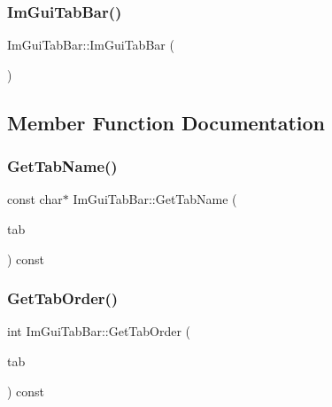 \subsubsection{\texorpdfstring{Im\+Gui\+Tab\+Bar()}{ImGuiTabBar()}}
{\footnotesize\ttfamily Im\+Gui\+Tab\+Bar\+::\+Im\+Gui\+Tab\+Bar (\begin{DoxyParamCaption}{ }\end{DoxyParamCaption})}



\subsection{Member Function Documentation}
\mbox{\label{structImGuiTabBar_a9296111fbd2316f354ca4bf952a09b93}} 
\subsubsection{\texorpdfstring{Get\+Tab\+Name()}{GetTabName()}}
{\footnotesize\ttfamily const char$\ast$ Im\+Gui\+Tab\+Bar\+::\+Get\+Tab\+Name (\begin{DoxyParamCaption}\item[{const \hyperlink{structImGuiTabItem}{Im\+Gui\+Tab\+Item} $\ast$}]{tab }\end{DoxyParamCaption}) const\hspace{0.3cm}{\ttfamily [inline]}}

\mbox{\label{structImGuiTabBar_aced33dc6164509331b3430239bd7dcbd}} 
\subsubsection{\texorpdfstring{Get\+Tab\+Order()}{GetTabOrder()}}
{\footnotesize\ttfamily int Im\+Gui\+Tab\+Bar\+::\+Get\+Tab\+Order (\begin{DoxyParamCaption}\item[{const \hyperlink{structImGuiTabItem}{Im\+Gui\+Tab\+Item} $\ast$}]{tab }\end{DoxyParamCaption}) const\hspace{0.3cm}{\ttfamily [inline]}}



